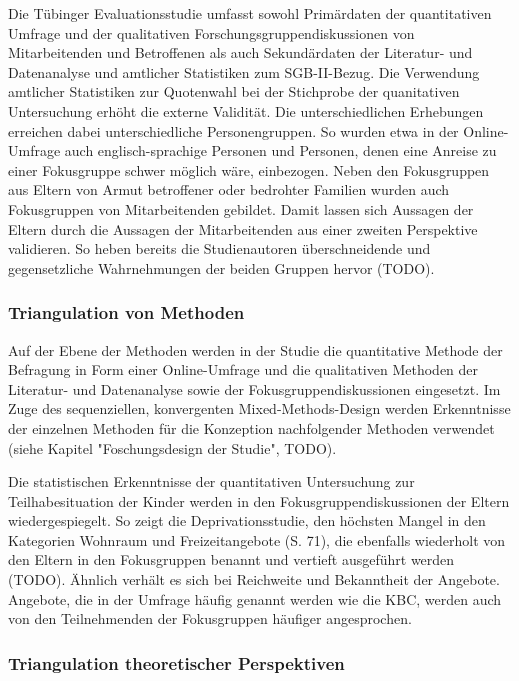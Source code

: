 Die Tübinger Evaluationsstudie umfasst sowohl Primärdaten der quantitativen Umfrage und der qualitativen Forschungsgruppendiskussionen von Mitarbeitenden und Betroffenen als auch Sekundärdaten der Literatur- und Datenanalyse und amtlicher Statistiken zum SGB-II-Bezug. Die Verwendung amtlicher Statistiken zur Quotenwahl bei der Stichprobe der quanitativen Untersuchung erhöht die externe Validität. Die unterschiedlichen Erhebungen erreichen dabei unterschiedliche Personengruppen. So wurden etwa in der Online-Umfrage auch englisch-sprachige Personen und Personen, denen eine Anreise zu einer Fokusgruppe schwer möglich wäre, einbezogen. Neben den Fokusgruppen aus Eltern von Armut betroffener oder bedrohter Familien wurden auch Fokusgruppen von Mitarbeitenden gebildet. Damit lassen sich Aussagen der Eltern durch die Aussagen der Mitarbeitenden aus einer zweiten Perspektive validieren. So heben bereits die Studienautoren überschneidende und gegensetzliche Wahrnehmungen der beiden Gruppen hervor (TODO).

\subsubsection{Triangulation von Methoden}

Auf der Ebene der Methoden werden in der Studie die quantitative Methode der Befragung in Form einer Online-Umfrage und die qualitativen Methoden der Literatur- und Datenanalyse sowie der Fokusgruppendiskussionen eingesetzt. Im Zuge des sequenziellen, konvergenten Mixed-Methods-Design werden Erkenntnisse der einzelnen Methoden für die Konzeption nachfolgender Methoden verwendet (siehe Kapitel "Foschungsdesign der Studie", TODO).

Die statistischen Erkenntnisse der quantitativen Untersuchung zur Teilhabesituation der Kinder werden in den Fokusgruppendiskussionen der Eltern wiedergespiegelt. So zeigt die Deprivationsstudie, den höchsten Mangel in den Kategorien Wohnraum und Freizeitangebote (S. 71), die ebenfalls wiederholt von den Eltern in den Fokusgruppen benannt und vertieft ausgeführt werden (TODO). Ähnlich verhält es sich bei Reichweite und Bekanntheit der Angebote. Angebote, die in der Umfrage häufig genannt werden wie die KBC, werden auch von den Teilnehmenden der Fokusgruppen häufiger angesprochen.

\subsubsection{Triangulation theoretischer Perspektiven}

